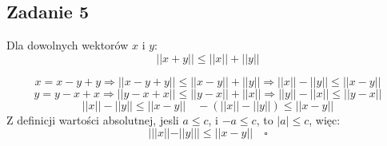 \documentclass{../notatki}
\begin{document}
\subsection{Zadanie 5}

Dla dowolnych wektorów $x$ i $y$:
$$
||x + y|| \leq ||x|| + ||y||
$$

$$
x = x - y + y \Rightarrow ||x - y + y|| \leq ||x - y|| +
||y||\Rightarrow ||x|| - ||y|| \leq ||x - y||
$$
$$
y = y - x + x \Rightarrow ||y - x + x|| \leq ||y - x|| +
||x||\Rightarrow ||y|| - ||x|| \leq ||y - x||
$$
$$
||x|| - ||y|| \leq ||x - y|| \quad -(||x|| - ||y||) \leq ||x - y||
$$
Z definicji wartości absolutnej, jesli $a \leq c$, i $-a \leq c$, to
$|a| \leq c$, więc:
$$
| ||x|| - ||y|| | \leq ||x - y|| \quad \square
$$
\end{document}

